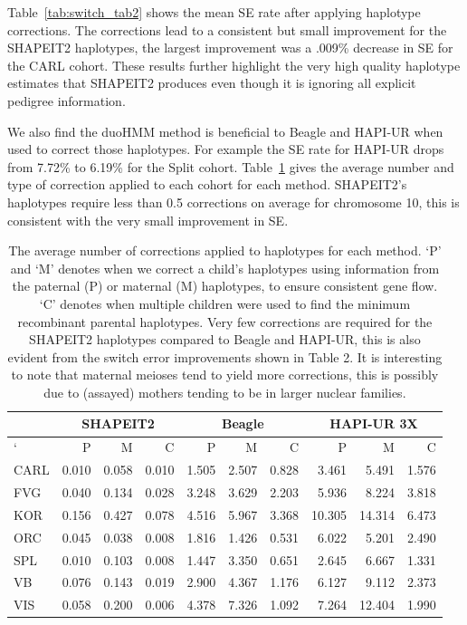 Table~\ref{tab:switch_tab2} shows the mean SE rate after applying haplotype corrections. The corrections lead to a consistent but small improvement for the SHAPEIT2 haplotypes, the largest improvement was a .009\% decrease in SE for the CARL cohort.  These results further highlight the very high quality haplotype estimates that SHAPEIT2 produces even though it is ignoring all explicit pedigree information. 

We also find the duoHMM method is beneficial to Beagle and HAPI-UR when used to correct those haplotypes. For example the SE rate for HAPI-UR drops from 7.72\% to 6.19\% for the Split cohort. Table~\ref{tab:correction_table} gives the average number and type of correction applied to each cohort for each method.  SHAPEIT2's haplotypes require less than 0.5 corrections on average for chromosome 10, this is consistent with the very small improvement in SE.

\begin{table}[h]
\centering
\begin{tabular}{|l|rrr|rrr|rrr|}
  \hline
  &\multicolumn{3}{c|}{SHAPEIT2}&\multicolumn{3}{c|}{Beagle}&\multicolumn{3}{c|}{HAPI-UR 3X}\\
  \hline`
  & P & M & C & P & M & C& P & M & C\\
  \hline
  CARL & 0.010 & 0.058 & 0.010 & 1.505 & 2.507 & 0.828 & 3.461 & 5.491 & 1.576 \\ 
  FVG & 0.040 & 0.134 & 0.028 & 3.248 & 3.629 & 2.203 & 5.936 & 8.224
  & 3.818 \\ 
  KOR & 0.156 & 0.427 & 0.078 & 4.516 & 5.967 & 3.368 & 10.305 & 14.314 & 6.473 \\ 
  ORC & 0.045 & 0.038 & 0.008 & 1.816 & 1.426 & 0.531 & 6.022 & 5.201 & 2.490 \\ 
  SPL & 0.010 & 0.103 & 0.008 & 1.447 & 3.350 & 0.651 & 2.645 & 6.667 & 1.331 \\ 
  VB & 0.076 & 0.143 & 0.019 & 2.900 & 4.367 & 1.176 & 6.127 & 9.112 & 2.373 \\ 
  VIS & 0.058 & 0.200 & 0.006 & 4.378 & 7.326 & 1.092 & 7.264 & 12.404 & 1.990 \\ 
  \hline
\end{tabular}
        \caption[Average number of corrections applied to haplotypes by DuoHMM]{The average number of corrections applied to haplotypes for each method. `P' and `M' denotes when we correct a child's haplotypes using information from the paternal (P) or maternal (M) haplotypes, to ensure consistent gene flow. `C' denotes when multiple children were used to find the minimum recombinant parental haplotypes.  Very few corrections are required for the SHAPEIT2 haplotypes compared to Beagle and HAPI-UR, this is also evident from the switch error improvements shown in Table 2. It is interesting to note that maternal meioses tend to yield more corrections, this is possibly due to (assayed) mothers tending to be in larger nuclear families.\label{tab:correction_table}}

\end{table}



